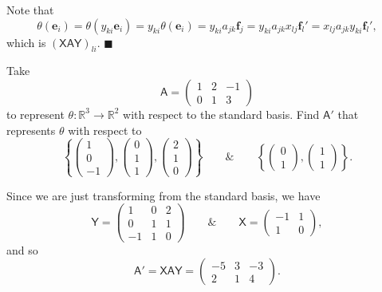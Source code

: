 \documentclass[letter-paper]{tufte-book}
\newenvironment{proof}[1][Proof]{\begin{trivlist}
\item[\hskip \labelsep {\bfseries #1}]}{\end{trivlist}}
\newenvironment{example}[1][Example]{\begin{trivlist}
\item[\hskip \labelsep {\bfseries #1}]}{\end{trivlist}}
\newcommand{\As}{{\mathsf{A}}}
\newcommand{\Xs}{{\mathsf{X}}}
\newcommand{\Ys}{{\mathsf{Y}}}
\newcommand{\eb}{{\boldsymbol{e}}}
\newcommand{\fb}{{\boldsymbol{f}}}
\newcommand{\qed}{\hfill$\blacksquare$}
\begin{document}
\begin{proof}
  Note that
  \begin{equation*}
    \theta(\eb_i) = \theta(y_{ki}\eb_i) = y_{ki}\theta(\eb_i) = y_{ki} a_{jk} \fb_j = y_{ki} a_{jk} x_{lj} \fb_l' = x_{lj} a_{jk} y_{ki} \fb_l',
  \end{equation*}
  which is $(\Xs \As \Ys)_{li}$. \qed
\end{proof}

\begin{example}
  Take
  \begin{equation*}
    \As = \begin{pmatrix}1 & 2 & -1 \\ 0 & 1 & 3\end{pmatrix}
  \end{equation*}
  to represent $\theta:\mathbb{R}^3 \to \mathbb{R}^2$ with respect to the standard basis. Find $\As'$ that represents $\theta$ with respect to
  \begin{equation*}
    \left\{\begin{pmatrix}1 \\ 0 \\ -1 \end{pmatrix}, \begin{pmatrix}0 \\ 1 \\ 1 \end{pmatrix}, \begin{pmatrix}2 \\ 1 \\ 0 \end{pmatrix} \right\} \qquad \& \qquad
    \left\{\begin{pmatrix}0 \\ 1 \end{pmatrix}, \begin{pmatrix} 1 \\ 1 \end{pmatrix} \right\}.
  \end{equation*}
  
  Since we are just transforming from the standard basis, we have
  \begin{equation*}
    \Ys = \begin{pmatrix} 1 & 0 & 2 \\ 0 & 1 & 1 \\ -1 & 1 & 0 \end{pmatrix} \qquad \& \qquad \Xs = \begin{pmatrix} -1 & 1 \\ 1 & 0 \end{pmatrix},
  \end{equation*}
  and so
  \begin{equation*}
    \As' = \Xs \As \Ys = \begin{pmatrix} -5 & 3 & -3 \\ 2 & 1 & 4 \end{pmatrix}.
  \end{equation*}
\end{example}
\end{document}
